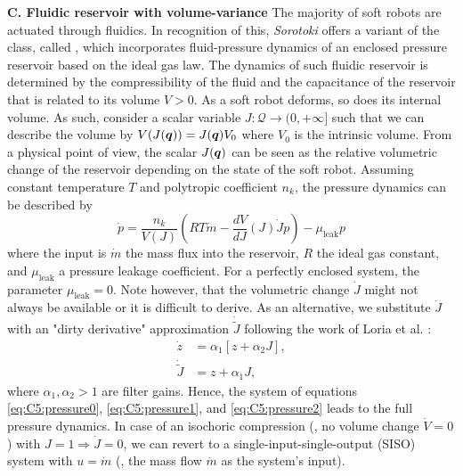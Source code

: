 \textbf{C. Fluidic reservoir with volume-variance}
The majority of soft robots are actuated through fluidics. In recognition of this, \textit{Sorotoki} offers a variant of the  class, called , which incorporates fluid-pressure dynamics of an enclosed pressure reservoir based on the ideal gas law. The dynamics of such fluidic reservoir is determined by the compressibility of the fluid and the capacitance of the reservoir that is related to its volume $V > 0$. As a soft robot deforms, so does its internal volume. As such, consider a scalar variable $J: \mathcal{Q} \to (0,+\infty]$ such that we can describe the volume by $V(J({\boldsymbol{q}})) = J({\boldsymbol{q}}) V_0$ where $V_0$ is the intrinsic volume. From a physical point of view, the scalar $J({\boldsymbol{q}})$ can be seen as the relative volumetric change of the reservoir depending on the state of the soft robot. Assuming constant temperature $T$ and polytropic coefficient $n_k$, the pressure dynamics can be described by
%
\begin{equation}
    \dot{p} = \frac{n_k}{V(J)} \left( R T \dot{m} - \frac{d V}{d J}(J) \dot{J} p \right) - \mu_{\textrm{leak}} p
    \label{eq:C5:pressure0}
\end{equation}
%
where the input is $\dot{m}$ the mass flux into the reservoir, $R$ the ideal gas constant, and $\mu_{\textrm{leak}}$ a pressure leakage coefficient. For a perfectly enclosed system, the parameter $\mu_{\textrm{leak}} = 0$. Note however, that the volumetric change $\dot{J}$ might not always be available or it is difficult to derive. As an alternative, we substitute $\dot{J}$ with an "dirty derivative" approximation $\dot{\tilde{J}}$ following the work of Loria et al. \cite{Loria2015Jun}:
%
\begin{align}
    \dot{z}         & = \alpha_1 [z + \alpha_2 J ], \label{eq:C5:pressure1}\\
    \dot{\tilde{J}} & = z + \alpha_1 J, \label{eq:C5:pressure2}
\end{align}
%
where $\alpha_1,\alpha_2> 1$ are filter gains. Hence, the system of equations \eqref{eq:C5:pressure0}, \eqref{eq:C5:pressure1}, and \eqref{eq:C5:pressure2} leads to the full pressure dynamics. In case of an isochoric compression (\ie, no volume change $\dot{V} = 0$) with $J = 1 \Rightarrow \dot{J} = 0$, we can revert to a single-input-single-output (SISO) system with $u = \dot{m}$ (\ie, the mass flow $\dot{m}$ as the system's input).

